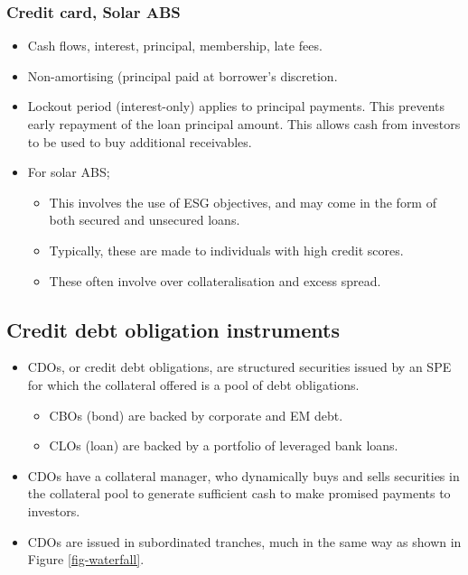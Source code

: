 \documentclass[../notes_compiled.tex]{subfiles}
\begin{document}
\subsubsection*{Credit card, Solar ABS}
\begin{itemize}
\item Cash flows, interest, principal, membership, late fees.
\item Non-amortising (principal paid at borrower’s discretion.
\item Lockout period (interest-only) applies to principal payments. This prevents early repayment of the loan principal amount. This allows cash from investors to be used to buy additional receivables.
\item For solar ABS;
\begin{itemize}
\item This involves the use of ESG objectives, and may come in the form of both secured and unsecured loans.
\item Typically, these are made to individuals with high credit scores.
\item These often involve over collateralisation and excess spread.
\end{itemize}
\end{itemize}


\subsection{Credit debt obligation instruments}
\begin{itemize}
\item CDOs, or credit debt obligations, are structured securities issued by an SPE for which the collateral offered is a pool of debt obligations.
\begin{itemize}
\item CBOs (bond) are backed by corporate and EM debt.
\item CLOs (loan) are backed by a portfolio of leveraged bank loans.
\end{itemize}
\item CDOs have a collateral manager, who dynamically buys and sells securities in the collateral pool to generate sufficient cash to make promised payments to investors.
\item CDOs are issued in subordinated tranches, much in the same way as shown in Figure \ref{fig-waterfall}.
\end{itemize}
\end{document}
